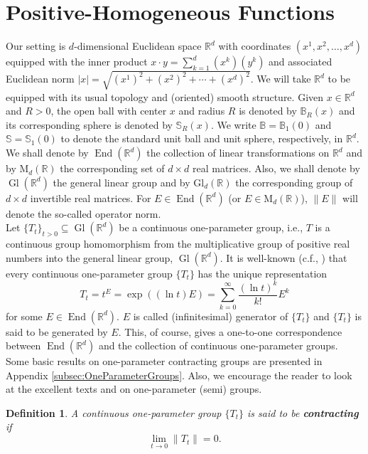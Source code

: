 \documentclass[11pt]{article}
\newtheorem{definition}[theorem]{Definition}
\newcommand\MdR{\mbox{M}_d(\mathbb{R})} %
\newcommand\End{\operatorname{End}} %
\newcommand\GldR{\mbox{Gl}_d(\mathbb{R})}%
\newcommand\Gl{\operatorname{Gl}} %
\begin{document}
\section{Positive-Homogeneous Functions}

Our setting is $d$-dimensional Euclidean space $\mathbb{R}^d$ with coordinates $(x^1,x^2,\dots,x^d)$ equipped with the inner product $x\cdot y=\sum_{k=1}^d(x^k)(y^k)$ and associated Euclidean norm $|x|=\sqrt{(x^1)^2+(x^2)^2+\cdots+(x^d)^2}$. We will take $\mathbb{R}^d$ to be equipped with its usual topology and (oriented) smooth structure. Given $x\in\mathbb{R}^d$ and $R>0$, the open ball with center $x$ and radius $R$ is denoted by $\mathbb{B}_R(x)$ and its corresponding sphere is denoted by $\mathbb{S}_R(x)$. We write $\mathbb{B}=\mathbb{B}_1(0)$ and $\mathbb{S}=\mathbb{S}_1(0)$ to denote the standard unit ball and unit sphere, respectively, in $\mathbb{R}^d$. We shall denote by $\End(\mathbb{R}^d)$ the collection of linear transformations on $\mathbb{R}^d$ and by $\MdR$ the corresponding set of $d\times d$ real matrices. Also, we shall denote by $\Gl(\mathbb{R}^d)$ the general linear group and by $\GldR$ the corresponding group of $d\times d$ invertible real matrices. For $E\in \End(\mathbb{R}^d)$ (or $E\in\MdR$), $\|E\|$ will denote the so-called operator norm.\\

\noindent Let $\{T_t\}_{t>0}\subseteq \Gl(\mathbb{R}^d)$ be a continuous one-parameter group, i.e., $T$ is a continuous group homomorphism from the multiplicative group of positive real numbers into the general linear group, $\Gl(\mathbb{R}^d)$. It is well-known (c.f., \cite{Randles2017,Engel2000,Engel2005}) that every continuous one-parameter group $\{T_t\}$ has the unique representation
\begin{equation*}
T_t=t^E=\exp((\ln t) E)=\sum_{k=0}^\infty \frac{(\ln t)^k}{k!}E^k
\end{equation*}
for some $E\in\End(\mathbb{R}^d)$. $E$ is called (infinitesimal) generator of $\{T_t\}$ and $\{T_t\}$ is said to be generated by $E$. This, of course, gives a one-to-one correspondence between $\End(\mathbb{R}^d)$ and the collection of continuous one-parameter groups. Some basic results on one-parameter contracting groups are presented in Appendix \ref{subsec:OneParameterGroups}. Also, we encourage the reader to look at the excellent texts \cite{Engel2005} and \cite{Engel2000} on one-parameter (semi) groups.

\begin{definition} A continuous one-parameter group $\{T_t\}$ is said to be \textbf{contracting} if
\begin{equation*}
\lim_{t\to 0}\|T_t\|=0. 
\end{equation*}
\end{definition}
\end{document}

